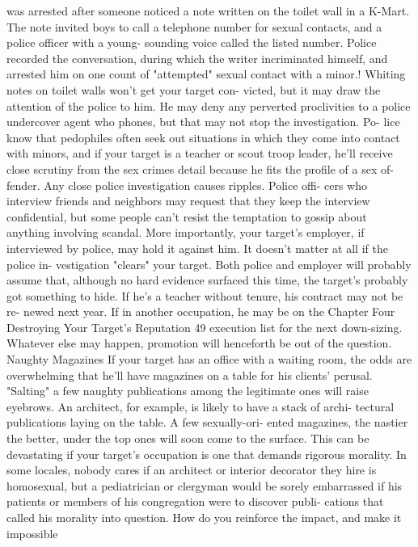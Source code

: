 \documentclass{book}
\begin{document}
was arrested after someone noticed a note written on the toilet 
wall in a K-Mart. The note invited boys to call a telephone 
number for sexual contacts, and a police officer with a young- 
sounding voice called the listed number. Police recorded the 
conversation, during which the writer incriminated himself, and 
arrested him on one count of "attempted" sexual contact with a 
minor.! 
Whiting notes on toilet walls won't get your target con- 
victed, but it may draw the attention of the police to him. He 
may deny any perverted proclivities to a police undercover 
agent who phones, but that may not stop the investigation. Po- 
lice know that pedophiles often seek out situations in which 
they come into contact with minors, and if your target is a 
teacher or scout troop leader, he'll receive close scrutiny from 
the sex crimes detail because he fits the profile of a sex of- 
fender. 
Any close police investigation causes ripples. Police offi- 
cers who interview friends and neighbors may request that they 
keep the interview confidential, but some people can't resist the 
temptation to gossip about anything involving scandal. More 
importantly, your target's employer, if interviewed by police, 
may hold it against him. It doesn't matter at all if the police in- 
vestigation "clears" your target. Both police and employer will 
probably assume that, although no hard evidence surfaced this 
time, the target's probably got something to hide. 
If he's a teacher without tenure, his contract may not be re- 
newed next year. If in another occupation, he may be on the 
Chapter Four 
Destroying Your Target's Reputation 
49 
execution list for the next down-sizing. Whatever else may 
happen, promotion will henceforth be out of the question. 
Naughty Magazines 
If your target has an office with a waiting room, the odds 
are overwhelming that he'll have magazines on a table for his 
clients’ perusal. "Salting" a few naughty publications among the 
legitimate ones will raise eyebrows. 
An architect, for example, is likely to have a stack of archi- 
tectural publications laying on the table. A few sexually-ori- 
ented magazines, the nastier the better, under the top ones will 
soon come to the surface. 
This can be devastating if your target's occupation is one 
that demands rigorous morality. In some locales, nobody cares 
if an architect or interior decorator they hire is homosexual, but 
a pediatrician or clergyman would be sorely embarrassed if his 
patients or members of his congregation were to discover publi- 
cations that called his morality into question. 
How do you reinforce the impact, and make it impossible 
\end{document}
